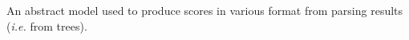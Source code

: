 An abstract model used to produce scores in various format from parsing results ({\itshape i.\+e.} from trees). 